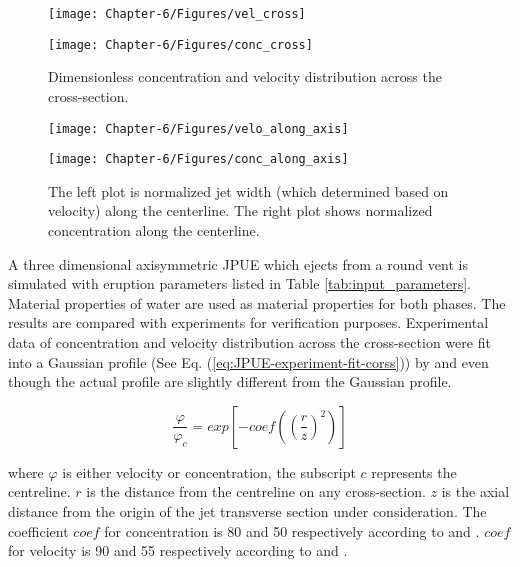 \begin{figure}[!htb]
    \centering
    \begin{minipage}{.41\textwidth}
        \centering
        \texttt{[image: Chapter-6/Figures/vel\_cross]}
    \end{minipage}%
    \begin{minipage}{.41 \textwidth}
        \centering
        \texttt{[image: Chapter-6/Figures/conc\_cross]}
    \end{minipage}%
    \caption{Dimensionless concentration and velocity distribution across the cross-section.}
    \label{fig:JPUE_cross-section}
\end{figure}

\begin{figure}[!htb]
    \centering
    \begin{minipage}{.41\textwidth}
        \centering
        \texttt{[image: Chapter-6/Figures/velo\_along\_axis]}
    \end{minipage}%
    \begin{minipage}{.41 \textwidth}
        \centering
        \texttt{[image: Chapter-6/Figures/conc\_along\_axis]}
    \end{minipage}%
    \caption{The left plot is normalized jet width (which determined based on velocity) along the centerline. The right plot shows normalized concentration along the centerline.}
    \label{fig:JPUE_along-axis}
\end{figure}

A three dimensional axisymmetric JPUE which ejects from a round vent is simulated with eruption parameters listed in Table \ref{tab:input_parameters}. Material properties of water are used as material properties for both phases. The results are compared with experiments \citep {george1977turbulence, papanicolaou1988investigations} for verification purposes. Experimental data of concentration and velocity distribution across the cross-section were fit into a Gaussian profile (See Eq. (\ref{eq:JPUE-experiment-fit-corss})) by \citet{papanicolaou1988investigations} and  \citet{ george1977turbulence} even though the actual profile are slightly different from the Gaussian profile.

\begin{equation}
\dfrac{\varphi}{\varphi_c}=exp \left[-coef\left( \left(\dfrac{r}{z}\right)^2\right)\right]
\label{eq:JPUE-experiment-fit-corss}
\end{equation}

where $\varphi$ is either velocity or concentration, the subscript $c$ represents the centreline. $r$ is the distance from the centreline on any cross-section. $z$ is the axial distance from the origin of the jet transverse section under consideration. 
The coefficient $coef$ for concentration is 80 and 50 respectively according to \citet{george1977turbulence} and \citet{papanicolaou1988investigations}.
$coef$ for velocity is 90 and 55 respectively according to \citet{george1977turbulence} and \citet{papanicolaou1988investigations}. 

